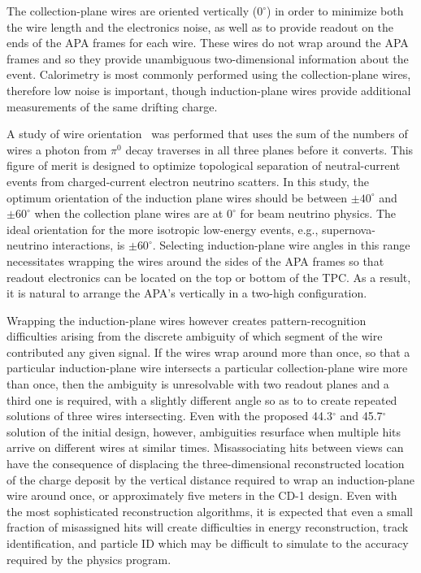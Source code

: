 The collection-plane wires are oriented vertically ($0^\circ$) in
order to minimize both the wire length and the electronics noise,
as well as to provide readout on the ends of the APA frames for
each wire.  These wires do not wrap around the APA frames and so
they provide unambiguous two-dimensional information about the
event.  Calorimetry is most commonly performed using the
collection-plane wires, therefore low noise is important, though
induction-plane wires provide additional measurements of the same
drifting charge.


A study of wire orientation~\cite{docdb2836} was performed that uses
the sum of the numbers of wires a photon from $\pi^0$ decay traverses
in all three planes before it converts.  This figure of merit is
designed to optimize topological separation of neutral-current events
from charged-current electron neutrino scatters.  In this study, the
optimum orientation of the induction plane wires should be between
$\pm40^\circ$ and $\pm60^\circ$ when the collection plane wires are at
$0^\circ$ for beam neutrino physics. The ideal orientation for the
more isotropic low-energy events, e.g., supernova-neutrino
interactions, is $\pm60^\circ$.  Selecting induction-plane wire angles
in this range necessitates wrapping the wires around the sides of the
APA frames so that readout electronics can be located on the top or
bottom of the TPC.  As a result, it is natural to arrange the APA's
vertically in a two-high configuration.

Wrapping the induction-plane wires however creates pattern-recognition
difficulties arising from the discrete ambiguity of which segment of
the wire contributed any given signal.  If the wires wrap around more
than once, so that a particular induction-plane wire intersects a
particular collection-plane wire more than once, then the ambiguity is%
unresolvable with two readout planes and a third one is required, with
a slightly different angle so as to to create repeated solutions of
three wires intersecting.  Even with the proposed 44.3$^\circ$ and
45.7$^\circ$ solution of the initial design, however, ambiguities
resurface when multiple hits arrive on different wires at similar
times.  Misassociating hits between views can have the consequence of
displacing the three-dimensional reconstructed location of the charge
deposit by the vertical distance required to wrap an induction-plane
wire around once, or approximately five meters in the CD-1 design.
Even with the most sophisticated reconstruction algorithms, it is
expected that even a small fraction of misassigned hits will create
difficulties in energy reconstruction, track identification, and
particle ID which may be difficult to simulate to the accuracy
required by the physics program.

